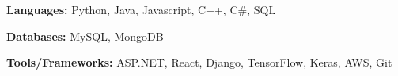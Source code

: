 \begin{siderulesSos}
\begin{skillSection}
\cvskillentry
    {
      \begin{cvsositems}
        \item {\color{black}\textbf{Languages:} Python, Java, Javascript, C++, C\#, SQL}
        \item {\color{black}\textbf{Databases:} MySQL, MongoDB}
        \item {\color{black}\textbf{Tools/Frameworks:} ASP.NET, React, Django, TensorFlow, Keras, AWS, Git}
      \end{cvsositems}
    }
\end{skillSection}
\end{siderulesSos}